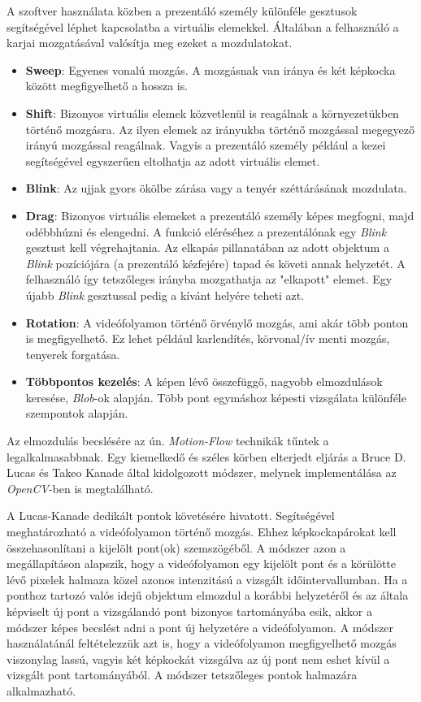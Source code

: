 

A szoftver használata közben a prezentáló személy különféle gesztusok segítségével léphet kapcsolatba a virtuális elemekkel. Általában a felhasználó a karjai mozgatásával valósítja meg ezeket a mozdulatokat.

\begin{itemize}
\item \textbf{Sweep}: Egyenes vonalú mozgás. A mozgásnak van iránya és két képkocka között megfigyelhető a hossza is.
\item \textbf{Shift}: Bizonyos virtuális elemek közvetlenül is reagálnak a környezetükben történő mozgásra. Az ilyen elemek az irányukba történő mozgással megegyező irányú mozgással reagálnak. Vagyis a prezentáló személy például a kezei segítségével egyszerűen eltolhatja az adott virtuális elemet.
\item \textbf{Blink}: Az ujjak gyors ökölbe zárása vagy a tenyér széttárásának mozdulata.
\item \textbf{Drag}: Bizonyos virtuális elemeket a prezentáló személy képes megfogni, majd odébbhúzni és elengedni. A funkció eléréséhez a prezentálónak egy \textit{Blink} gesztust kell végrehajtania. Az elkapás pillanatában az adott objektum a \textit{Blink} pozíciójára (a prezentáló kézfejére) tapad és követi annak helyzetét. A felhasználó így tetszőleges irányba mozgathatja az "elkapott" elemet. Egy újabb \textit{Blink} gesztussal pedig a kívánt helyére teheti azt.
\item \textbf{Rotation}: A videófolyamon történő örvénylő mozgás, ami akár több ponton is megfigyelhető. Ez lehet például karlendítés, körvonal/ív menti mozgás, tenyerek forgatása.
\item \textbf{Többpontos kezelés}: A képen lévő összefüggő, nagyobb elmozdulások keresése, \textit{Blob}-ok alapján. Több pont egymáshoz képesti vizsgálata különféle szempontok alapján.
\end{itemize}


Az elmozdulás becslésére az ún. \textit{Motion-Flow} technikák tűntek a legalkalmasabbnak. Egy kiemelkedő és széles körben elterjedt eljárás a Bruce D. Lucas és Takeo Kanade által kidolgozott módszer, melynek implementálása az \textit{OpenCV}-ben is megtalálható.

A Lucas-Kanade dedikált pontok követésére hivatott. Segítségével meghatározható a videófolyamon történő mozgás. Ehhez képkockapárokat kell összehasonlítani a kijelölt pont(ok) szemszögéből. A módszer azon a megállapításon alapszik, hogy a videófolyamon egy kijelölt pont és a körülötte lévő pixelek halmaza közel azonos intenzitású a vizsgált időintervallumban. Ha  a ponthoz tartozó valós idejű objektum elmozdul a korábbi helyzetéről és az általa képviselt új pont a vizsgálandó pont bizonyos tartományába esik, akkor a módszer képes becslést adni a pont új helyzetére a videófolyamon. A módszer használatánál feltételezzük azt is, hogy a videófolyamon megfigyelhető mozgás viszonylag lassú, vagyis két képkockát vizsgálva az új pont nem eshet kívül a vizsgált pont tartományából. A módszer tetszőleges pontok halmazára alkalmazható.

